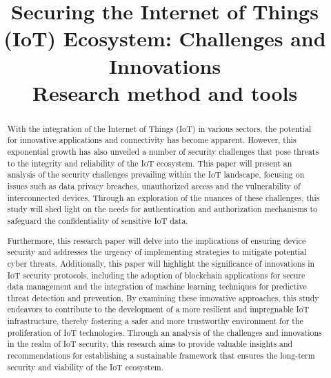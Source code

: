 \documentclass[conference]{IEEEtran}
\begin{document}
\title{Securing the Internet of Things (IoT) Ecosystem: Challenges and Innovations\\
{\footnotesize Research method and tools}
}

\author{
\and
{}
\and
{}
}

\maketitle

\begin{abstract}
With the integration of the Internet of Things (IoT) in various sectors, the potential for innovative applications and connectivity has become apparent. However, this exponential growth has also unveiled a number of security challenges that pose  threats to the integrity and reliability of the IoT ecosystem. This paper will present an analysis of the security challenges prevailing within the IoT landscape, focusing on issues such as data privacy breaches, unauthorized access and the vulnerability of interconnected devices. Through an exploration of the nuances of these challenges, this study will shed light on the needs for authentication and authorization mechanisms to safeguard the confidentiality of sensitive IoT data.

Furthermore, this research paper will delve into the implications of ensuring device security and addresses the urgency of implementing strategies to mitigate potential cyber threats. Additionally, this paper will highlight the significance of innovations in IoT security protocols, including the adoption of blockchain applications for secure data management and the integration of machine learning techniques for predictive threat detection and prevention. By examining these innovative approaches, this study endeavors to contribute to the development of a more resilient and impregnable IoT infrastructure, thereby fostering a safer and more trustworthy environment for the proliferation of IoT technologies. Through an analysis of the challenges and innovations in the realm of IoT security, this research aims to provide valuable insights and recommendations for establishing a sustainable framework that ensures the long-term security and viability of the IoT ecosystem.
\end{abstract}
\end{document}
